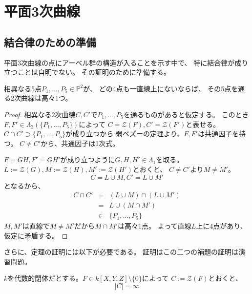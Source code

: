 \documentclass[a4]{article}
\newcommand{\proj}{\mathbb{P}}
\begin{document}
    \section{平面3次曲線}
    \subsection{結合律のための準備}
        平面3次曲線の点にアーベル群の構造が入ることを示す中で、
        特に結合律が成り立つことは自明でない。
        その証明のために準備する。

        \begin{Lemma} \label{lemma401:1}
            相異なる5点$P_1, \dots, P_5 \in \proj^2$が、
            どの4点も一直線上にないならば、
            その5点を通る2次曲線は高々1つ。
        \end{Lemma}
        \begin{proof}
            相異なる2次曲線$C, C'$で$P_1, \dots, P_5$を通るものがあると仮定する。
            このとき$F, F' \in \Lambda_2(\{P_1, \dots, P_5\})$によって
            $C=\mathcal{Z}(F), C'=\mathcal{Z}(F')$と表せる。
            $C \cap C' \supset \{P_1, \dots, P_5\}$が成り立つから
            弱ベズーの定理より、$F,F'$は共通因子を持つ。
            $C \neq C'$から、共通因子は1次式。

            $F=GH, F'=GH'$が成り立つように$G,H,H' \in \Lambda_1$を取る。
            $L:=\mathcal{Z}(G), M:=\mathcal{Z}(H), M':=\mathcal{Z}(H')$とおくと、
            $C\neq C'$より$M \neq M'$。
            \[ C=L \cup M, C'=L \cup M' \]
            となるから、
            \begin{eqnarray*}
                C \cap C'
                &=&(L \cup M) \cap (L \cup M') \\ 
                &=& L \cup (M \cap M') \\
                &\in& \{P_1, \dots, P_5\}
            \end{eqnarray*}
            $M, M'$は直線で$M \neq M'$だから$M \cap M'$は高々1点。
            よって直線$L$上に4点があり、仮定に矛盾する。
        \end{proof}

        さらに、定理の証明には以下が必要である。
        証明はこの二つの補題の証明は演習問題。
        \begin{Lemma}
            $k$を代数的閉体だとする。$F \in k[X,Y,Z] \setminus \{0\}$によって
            $C:=\mathcal{Z}(F)$とおくと、
            \[ |C|=\infty \]
        \end{Lemma}
\end{document}
